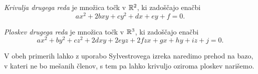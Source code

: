 \documentclass[12pt, a4paper]{article}
\begin{document}
\begin{definicija}
\emph{Krivulja drugega reda} je množica točk v $\mathbb{R}^2$, ki zadoščajo enačbi
\[
ax^2+2bxy+cy^2+dx+ey+f=0.
\]
\end{definicija}

\begin{definicija}
\emph{Ploskev drugega reda} je množica točk v $\mathbb{R}^3$, ki zadoščajo enačbi
\[
ax^2+by^2+cz^2+2dxy+2eyz+2fzx+gx+hy+iz+j=0.
\]
\end{definicija}

\begin{opomba}
V obeh primerih lahko z uporabo Sylvestrovega izreka naredimo prehod na bazo, v kateri ne bo mešanih členov, s tem pa lahko krivuljo oziroma ploskev narišemo.
\end{opomba}

\newpage
\printindex
\end{document}
